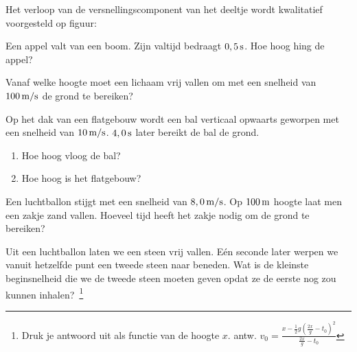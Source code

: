 \documentclass{ximera}
\begin{document}
\begin{exercise} Het verloop van de versnellingscomponent van het deeltje wordt kwalitatief voorgesteld op figuur:
%
%





\end{exercise}

\begin{exercise} Een appel valt van een boom. Zijn valtijd bedraagt $0,5\rm\,s$. Hoe hoog hing de appel?



\end{exercise}

\begin{exercise} Vanaf welke hoogte moet een lichaam vrij vallen om met een snelheid van $100\rm\,m/s$ de grond te bereiken?



\end{exercise}

\begin{exercise} Op het dak van een flatgebouw wordt een bal verticaal
opwaarts geworpen met een snelheid van $10\rm\,m/s$. $4,0\rm\,s$
later bereikt de bal de grond.
\begin{enumerate}
\item Hoe hoog vloog de bal?
\item Hoe hoog is het flatgebouw?
\end{enumerate}

\end{exercise}

\begin{exercise} Een luchtballon stijgt met een snelheid van $8,0\rm\,m/s$. Op
$100\rm\,m$ hoogte laat men een zakje zand vallen. Hoeveel tijd
heeft het zakje nodig om de grond te bereiken?

\end{exercise}

\begin{exercise} Uit een luchtballon laten we een steen vrij vallen. E\'en
seconde later werpen we vanuit hetzelfde punt een tweede steen naar
beneden. Wat is de kleinste beginsnelheid die we de tweede steen
moeten geven opdat ze de eerste nog zou kunnen
inhalen?~\footnote{Druk je antwoord uit als functie van de hoogte
$x$. antw.
$v_0=\frac{x-\frac{1}{2}g(\frac{2x}{g}-t_0)^2}{\frac{2x}{g}-t_0}$}

\end{exercise}
\end{document}
